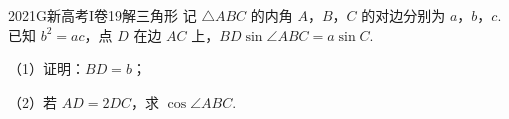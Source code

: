 
\begin{problem}{2021}{G}{新高考I卷}{19}{解三角形}
记 $ \triangle ABC $ 的内角 $ A $，$ B $，$ C $ 的对边分别为 $ a $，$ b $，$ c $.已知 $ b^2=ac $，点 $ D $ 在边 $ AC $ 上，$ BD\sin\angle ABC=a\sin C $.

（1）证明：$ BD=b $；

（2）若 $ AD=2DC $，求 $ \cos\angle ABC $.
\end{problem}

\begin{answer}

\end{answer}

\begin{solutions}

\end{solutions}